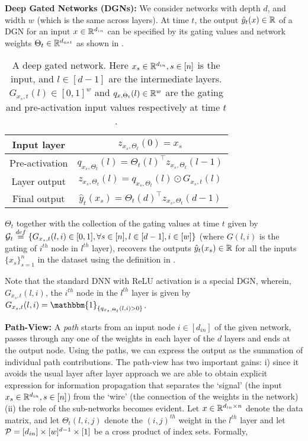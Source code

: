 \textbf{Deep Gated Networks (DGNs):} We consider networks with depth $d$, and width $w$ (which is the same across layers). At time $t$, the output $\hat{y}_{t}(x)\in \R$ of a DGN for an input $x\in \R^{d_{in}}$ can be specified by its gating values and network weights $\Theta_t\in \R^{d_{net}}$ as shown in .

\FloatBarrier
\begin{table}[h]
\centering
\begin{tabular}{|c|c|}\hline
Input layer & $z_{x_s,\Theta_t}(0)=x_s$ \\\hline
Pre-activation & $q_{x_s,\Theta_t}(l)={\Theta_t(l)}^\top z_{x_s,\Theta_t}(l-1)$\\\hline
Layer output & $z_{x_s,\Theta_t}(l)=q_{x_s,\Theta_t}(l)\odot G_{x_s,t}(l)$ \\\hline
Final output & $\hat{y}_t(x_s)={\Theta_t(d)}^\top z_{x_s,\Theta_t}(d-1)$\\\hline
\end{tabular}
\caption{A deep gated network. Here $x_s\in \R^{d_{in}},s\in [n]$ is the input, and $l\in[d-1]$ are the intermediate layers. $G_{x_s,t}(l)\in [0,1]^w$ and $q_{x,\Theta_t}(l)\in \R^w$ are the gating and pre-activation input values respectively at time $t$.}
\label{tb:dgn}
\end{table}
\newpage
$\Theta_t$ together with the collection of the gating values at time $t$ given by $\G_t\stackrel{def}=\{G_{x_{s},t}(l,i) \in [0,1], \forall s\in[n],l\in[d-1],i\in[w]\}$ (where $G(l,i)$ is the gating of $i^{th}$ node in $l^{th}$ layer), recovers the outputs $\hat{y}_t(x_s)\in \R$ for all the inputs $\{x_s\}_{s=1}^n$ in the dataset using the definition in . 

Note that the standard DNN with ReLU activation is a special DGN, wherein, $G_{x_s,t}(l,i)$, the $i^{th}$ node in the $l^{th}$ layer is given by $G_{x_s,t}(l,i)=\mathbbm{1}_{\{q_{x_s,\Theta_t}(l,i) >0\}}$.	

\textbf{Path-View:} A \emph{path} starts from an input node $i\in[d_{in}]$ of the given network, passes through any one of the weights in each layer of the $d$ layers and ends at the output node. Using the paths, we can express the output as the summation of individual  path contributions. The path-view has two important gains: i)  since it avoids the usual layer after layer approach we are able to obtain explicit expression for information propagation that separates the `signal' (the input $x_s\in \R^{d_{in}},s\in[n]$) from the `wire' (the connection of the weights in the network)  (ii) the role of the sub-networks becomes evident. Let $x\in \R^{d_{in}\times n}$ denote the data matrix, and let $\Theta_t(l,i,j)$ denote the ${(i,j)}^{th}$ weight in the $l^{th}$ layer and let $\P=[d_{in}]\times [w]^{d-1}\times[1]$ be a cross product of index sets. Formally,

